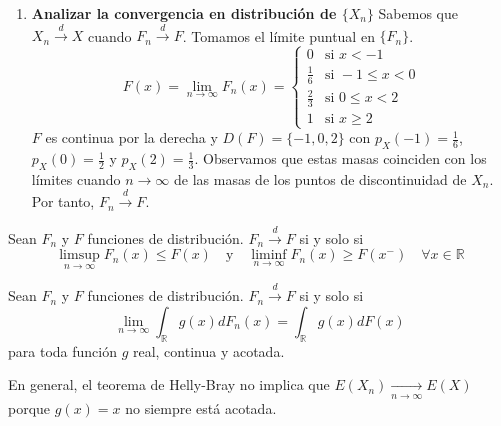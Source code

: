 \begin{exercise}
\begin{enumerate}
        \item \textbf{Analizar la convergencia en distribución de $\{X_n\}$}
              Sabemos que $X_n \xrightarrow{d} X$ cuando $F_n \xrightarrow{d} F$.
              Tomamos el límite puntual en $\{F_n\}$.
              $$F(x) = \lim\limits_{n \to \infty} F_n(x) = \begin{cases}
                      0           & \text{si } x < -1        \\
                      \frac{1}{6} & \text{si } -1 \leq x < 0 \\
                      \frac{2}{3} & \text{si } 0 \leq x < 2  \\
                      1           & \text{si } x \geq 2
                  \end{cases}$$
              $F$ es continua por la derecha y $D(F) = \{-1, 0, 2\}$ con $p_X(-1) = \frac{1}{6}$, $p_X(0) = \frac{1}{2}$ y $p_X(2) = \frac{1}{3}$.
              Observamos que estas masas coinciden con los límites cuando $n \to \infty$ de las masas de los puntos de discontinuidad de $X_n$.
              Por tanto, $F_n \xrightarrow{d} F$.
    \end{enumerate}
\end{exercise}

\begin{lemma}
    Sean $F_n$ y $F$ funciones de distribución.
    $F_n \xrightarrow{d} F$ si y solo si
    $$\limsup\limits_{n \to \infty} F_n(x) \leq F(x) \quad \text{y} \quad \liminf\limits_{n \to \infty} F_n(x) \geq F(x^-) \quad \forall x \in \mathbb{R}$$
\end{lemma}

\begin{theorem}
    Sean $F_n$ y $F$ funciones de distribución.
    $F_n \xrightarrow{d} F$ si y solo si
    $$\lim\limits_{n \to \infty} \int_\mathbb{R} g(x)dF_n(x) = \int_\mathbb{R} g(x)dF(x)$$
    para toda función $g$ real, continua y acotada.
\end{theorem}

\begin{remark}
    En general, el teorema de Helly-Bray no implica que $E(X_n) \xrightarrow[n \to \infty]{} E(X)$ porque $g(x) = x$ no siempre está acotada.
\end{remark}

